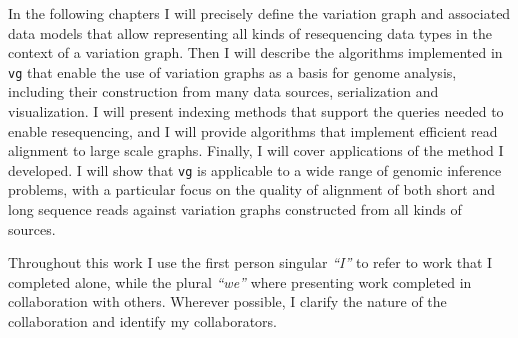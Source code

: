In the following chapters I will precisely define the variation graph and associated data models that allow representing all kinds of resequencing data types in the context of a variation graph.
Then I will describe the algorithms implemented in {\tt vg} that enable the use of variation graphs as a basis for genome analysis, including their construction from many data sources, serialization and visualization.
I will present indexing methods that support the queries needed to enable resequencing, and I will provide algorithms that implement efficient read alignment to large scale graphs.
Finally, I will cover applications of the method I developed.
I will show that {\tt vg} is applicable to a wide range of genomic inference problems, with a particular focus on the quality of alignment of both short and long sequence reads against variation graphs constructed from all kinds of sources.

Throughout this work I use the first person singular \emph{``I''} to refer to work that I completed alone, while the plural \emph{``we''} where presenting work completed in collaboration with others.
Wherever possible, I clarify the nature of the collaboration and identify my collaborators.
